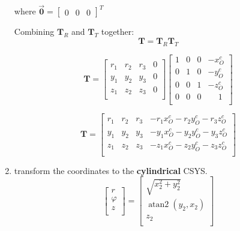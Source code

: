 \documentclass[10pt,b5paper,titlepage]{book}
\newcommand{\m}{\mathbf}
\DeclareMathOperator{\atantwo}{atan2}
\begin{document}
\begin{enumerate}
         where $ \vec{\m{0}} = \begin{bmatrix} 0 & 0 & 0 \end{bmatrix}^T $

         Combining $ \m{T}_R $ and $ \m{T}_T $ together:
         \begin{equation}
             \m{T} = \m{T}_R \m{T}_T
         \end{equation}

         \begin{equation}
             \m{T} = \begin{bmatrix}
                 r_1 & r_2 & r_3 & 0 \\
                 y_1 & y_2 & y_3 & 0 \\
                 z_1 & z_2 & z_3 & 0 \\
             \end{bmatrix}
             \begin{bmatrix}
                 1 & 0 & 0 & -x_O^c \\
                 0 & 1 & 0 & -y_O^c \\
                 0 & 0 & 1 & -z_O^c \\
                 0 & 0 & 0 & \phantom{-}1 \\
             \end{bmatrix}
         \end{equation}

         \begin{equation}
             \m{T} = \begin{bmatrix}
                 r_1 & r_2 & r_3 & -r_1 x_O^c -r_2 y_O^c -r_3 z_O^c  \\
                 y_1 & y_2 & y_3 & -y_1 x_O^c -y_2 y_O^c -y_3 z_O^c  \\
                 z_1 & z_2 & z_3 & -z_1 x_O^c -z_2 y_O^c -z_3 z_O^c  \\
             \end{bmatrix}
         \end{equation}


    \item transform the coordinates to the \textbf{cylindrical} CSYS.
        \begin{equation}
            \begin{bmatrix}
                r \\
                \varphi \\
                z \\
            \end{bmatrix}
            = \begin{bmatrix}
                \sqrt{x_2^2 + y_2^2} \\
                \atantwo \left(y_2, x_2\right) \\
                z_2 \\
            \end{bmatrix}
        \end{equation}

\end{enumerate}
\end{document}
